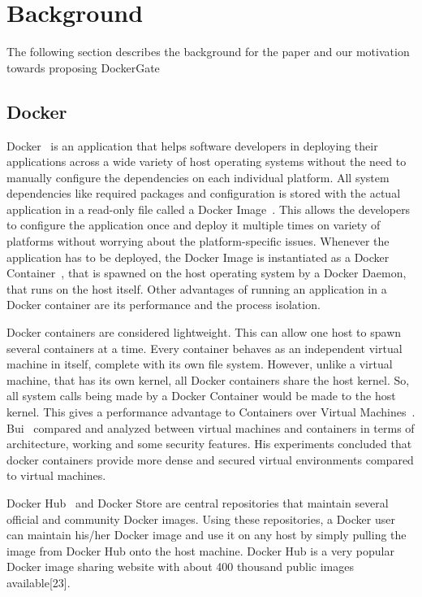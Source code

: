 \section{Background}
\label{sec:background}
The following section describes the background for the paper and our motivation towards proposing DockerGate
\subsection{Docker}
Docker~\cite{docker} is an application that helps software developers in deploying their applications across a wide variety of host operating systems without the need to manually configure the dependencies on each individual platform. All system dependencies like required packages and configuration is stored with the actual application in a read-only file called a Docker Image~\cite{dockerimages}. This allows the developers to configure the application once and deploy it multiple times on variety of platforms without worrying about the platform-specific issues. Whenever the application has to be deployed, the Docker Image is instantiated as a Docker Container~\cite{dockerimages}, that is spawned on the host operating system by a Docker Daemon, that runs on the host itself. Other advantages of running an application in a Docker container are its performance and the process isolation.

Docker containers are considered lightweight. This can allow one host to spawn several containers at a time. Every container behaves as an independent virtual machine in itself, complete with its own file system. However, unlike a virtual machine, that has its own kernel, all Docker containers share the host kernel. So, all system calls being made by a Docker Container would be made to the host kernel. This gives a performance advantage to Containers over Virtual Machines~\cite{kyoung2014}. Bui~\cite{bui} compared and analyzed between virtual machines and containers in terms of architecture, working and some security features. His experiments concluded that docker containers provide more dense and secured virtual environments compared to virtual machines.

Docker Hub~\cite{dockerhub} and Docker Store are central repositories that maintain several official and community Docker images. Using these repositories, a Docker user can maintain his/her Docker image and use it on any host by simply pulling the image from Docker Hub onto the host machine. Docker Hub is a very popular Docker image sharing website with about 400 thousand public images available[23]. 
